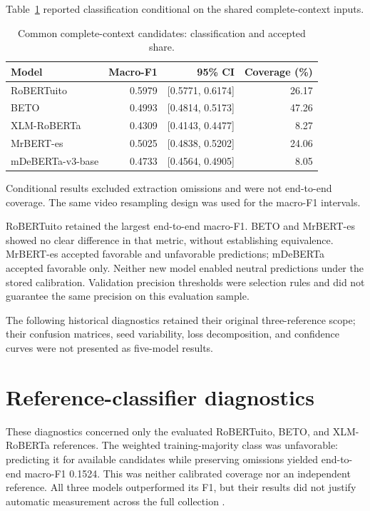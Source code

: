 \documentclass[11pt,a4paper]{article}
\begin{document}
Table~\ref{tab:supp_common} reported classification conditional on the shared complete-context inputs.

\begin{table}[H]\centering\small
\caption{Common complete-context candidates: classification and accepted share.}
\label{tab:supp_common}
\setlength{\tabcolsep}{4pt}
\begin{tabular}{lrrr}\toprule
Model & Macro-F1 & 95\% CI & Coverage (\%)\\\midrule
RoBERTuito & 0.5979 & [0.5771, 0.6174] & 26.17\\
BETO & 0.4993 & [0.4814, 0.5173] & 47.26\\
XLM-RoBERTa & 0.4309 & [0.4143, 0.4477] & 8.27\\
MrBERT-es & 0.5025 & [0.4838, 0.5202] & 24.06\\
mDeBERTa-v3-base & 0.4733 & [0.4564, 0.4905] & 8.05\\
\bottomrule\end{tabular}
\par\smallskip\footnotesize Conditional results excluded extraction omissions and were not end-to-end coverage. The same video resampling design was used for the macro-F1 intervals.
\end{table}

RoBERTuito retained the largest end-to-end macro-F1. BETO and MrBERT-es showed no clear difference in that metric, without establishing equivalence. MrBERT-es accepted favorable and unfavorable predictions; mDeBERTa accepted favorable only. Neither new model enabled neutral predictions under the stored calibration. Validation precision thresholds were selection rules and did not guarantee the same precision on this evaluation sample.

The following historical diagnostics retained their original three-reference scope; their confusion matrices, seed variability, loss decomposition, and confidence curves were not presented as five-model results.

\section{Reference-classifier diagnostics}

These diagnostics concerned only the evaluated RoBERTuito, BETO, and XLM-RoBERTa references. The weighted training-majority class was unfavorable: predicting it for available candidates while preserving omissions yielded end-to-end macro-F1 0.1524. This was neither calibrated coverage nor an independent reference. All three models outperformed its F1, but their results did not justify automatic measurement across the full collection \cite{GrimmerStewart2013}.
\end{document}
